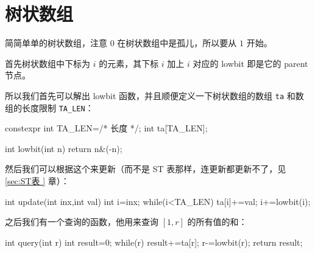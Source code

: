 \section{树状数组}
简简单单的树状数组，注意 $0$ 在树状数组中是孤儿，所以要从 $1$ 开始。

首先树状数组中下标为 $i$ 的元素，其下标 $i$ 加上 $i$ 对应的 lowbit 即是它的
parent 节点。

所以我们首先可以解出 lowbit 函数，并且顺便定义一下树状数组的数组 \verb|ta| 和数
组的长度限制 \verb|TA_LEN|：
\begin{Cpp}
constexpr int TA_LEN=/* 长度 */;
int ta[TA_LEN];

int lowbit(int n){
  return n&(-n);
}
\end{Cpp}

然后我们可以根据这个来更新（而不是 ST 表那样，连更新都更新不了，见 \ref{sec:ST表
} 章）：
\begin{Cpp}
int update(int inx,int val){
  int i=inx;
  while(i<TA_LEN){
    ta[i]+=val;
    i+=lowbit(i);
  }
}
\end{Cpp}

之后我们有一个查询的函数，他用来查询 $[1, r]$ 的所有值的和：
\begin{Cpp}
int query(int r){
  int result=0;
  while(r){
    result+=ta[r];
    r-=lowbit(r);
  }
  return result;
}
\end{Cpp}
